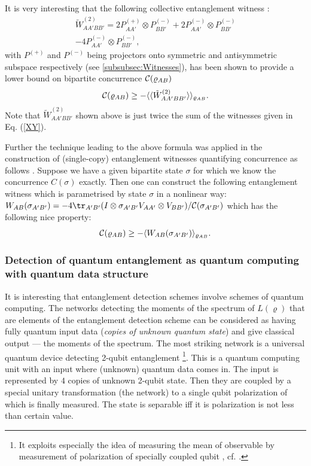 \documentclass[rmp,12pt,preprint]{revtex4-2}
\begin{document}
It is very interesting that the following collective
entanglement witness \cite{MintertBuchleitner}:
\begin{eqnarray}
\tilde{W}_{AA'BB'}^{(2)}=2P^{(+)}_{AA'} \otimes P^{(-)}_{BB'} + 2
P^{(-)}_{AA'} \otimes P^{(-)}_{BB'} \nonumber \\- 4P^{(-)}_{AA'} \otimes
P^{(-)}_{BB'},
 \label{ConcurrenceWitness}
\end{eqnarray}
with $P^{(+)}$ and $P^{(-)}$ being projectors onto symmetric
and antisymmetric subspace respectively (see \ref{subsubsec:Witnesses}), has been shown to provide a
lower bound on bipartite concurrence  ${\cal
C}(\varrho_{AB})$ \cite{MintertKB04-conc}
\begin{eqnarray}
  {\cal C}(\varrho_{AB})\geq -\langle
 \langle \tilde{W}_{AA'BB'}^{(2)}\rangle\rangle_{\varrho_{AB}}.
 \label{con}
\end{eqnarray}
Note that $\tilde{W}_{AA'BB'}^{(2)}$ shown above is  just twice the sum
of the witnesses given in Eq. (\ref{XY}).

Further the technique leading to the above formula was applied in
the construction of   (single-copy) entanglement witnesses quantifying
concurrence as follows  \cite{Mintert2006}.
Suppose we have a given bipartite state $\sigma $ for which we know
the concurrence $C(\sigma)$ exactly.  Then one can construct the following
entanglement witness  which is parametrised by state $\sigma$ in a nonlinear
way:
$W_{AB}(\sigma_{A'B'})=-4\tr_{A'B'}(I \otimes \sigma_{A'B'}
 V_{AA'} \otimes V_{BB'})/{\cal C}(\sigma_{A'B'})$  which has the following
nice property:
\begin{equation}
{\cal C}(\varrho_{AB}) \geq - \langle W_{AB}(\sigma_{A'B'})
\rangle_{\varrho_{AB}}.
\end{equation}



\subsubsection{Detection of quantum entanglement as quantum computing
with quantum data structure \label{subsubsec:QuantumDataStructure}}

It is interesting that entanglement detection schemes involve
schemes of quantum computing. The networks detecting the moments of
the spectrum of $L(\varrho)$ that are elements of the entanglement
detection scheme \cite{PHAE,PHPRL,reshuff,Carteret} can be
considered as having fully quantum input data ({\it copies of
unknown quantum state}) and give classical output --- the moments of
the spectrum. The most striking network is a universal
quantum device detecting 2-qubit entanglement
\cite{Augusiak}\footnote{It exploits especially the idea of
measuring the mean of observable by measurement of polarization of
specially coupled qubit \cite{binpovm,PazRoncaglia}, cf.
\cite{Brun}.}. This is a quantum computing unit with an input where
(unknown) quantum data comes in. The input is represented by $4$
copies of unknown 2-qubit state. Then they are coupled by a special
unitary transformation (the network) to a single qubit polarization
of which is finally measured. The state is separable iff it is
polarization is not less than certain value.
\end{document}
